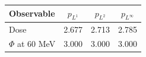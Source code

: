 \begin{tabular}{lccc}
\toprule
Observable & $p_{L^1}$ & $p_{L^2}$ & $p_{L^\infty}$ \\
\midrule
Dose & 2.677 & 2.713 & 2.785 \\
$\Phi$ at 60 MeV & 3.000 & 3.000 & 3.000 \\
\bottomrule
\end{tabular}
